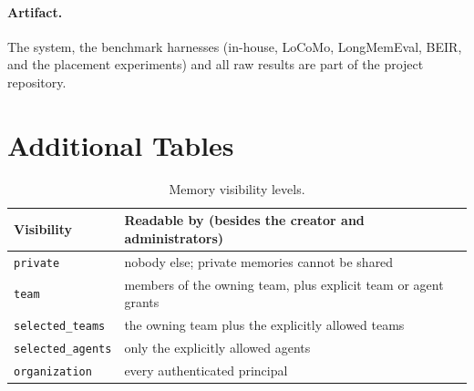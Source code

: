 \documentclass[11pt,a4paper]{article}
\theoremstyle{remark}
\begin{document}
\paragraph{Artifact.} The system, the benchmark harnesses (in-house, LoCoMo, LongMemEval, BEIR, and the placement
experiments) and all raw results are part of the project repository.




\clearpage
\appendix
\section{Additional Tables}

\begin{table}[htbp]
\centering
\small
\caption{Memory visibility levels.}
\label{tab:visibility}
\begin{tabular}{@{}ll@{}}
\toprule
Visibility & Readable by (besides the creator and administrators) \\
\midrule
\texttt{private} & nobody else; private memories cannot be shared \\
\texttt{team} & members of the owning team, plus explicit team or agent grants \\
\texttt{selected\_teams} & the owning team plus the explicitly allowed teams \\
\texttt{selected\_agents} & only the explicitly allowed agents \\
\texttt{organization} & every authenticated principal \\
\bottomrule
\end{tabular}
\end{table}
\end{document}
